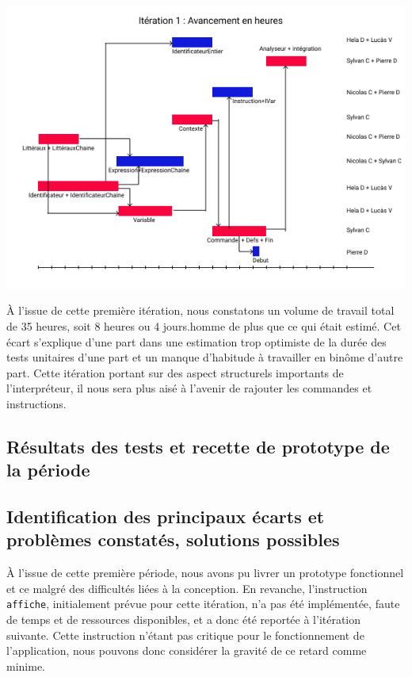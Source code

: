 \documentclass[12pt,a4paper,titlepage,openany, oneside]{report}
\begin{document}
        \includegraphics[scale=0.75]{fichiers/planification/iteration1/iteration1Avancement.png}

        \`{A} l'issue de cette première itération, nous constatons un volume de travail
        total de 35 heures, soit 8 heures ou 4 jours.homme de plus que ce qui était
        estimé. Cet écart s'explique d'une part dans une estimation trop optimiste de la
        durée des tests unitaires d'une part et un manque d'habitude à travailler en
        binôme d'autre part. Cette itération portant sur des aspect structurels importants
        de l'interpréteur, il nous sera plus aisé à l'avenir de rajouter les commandes
        et instructions.


    \subsection{Résultats des tests et recette de prototype de la période}


    \subsection{Identification des principaux écarts et problèmes constatés, solutions possibles}
        \`{A} l'issue de cette première période, nous avons pu livrer un prototype
        fonctionnel et ce malgré des difficultés liées à la conception. En revanche,
        l'instruction \verb|affiche|, initialement prévue pour cette itération, n'a
        pas été implémentée, faute de temps et de ressources disponibles, et a donc été
        reportée à l'itération suivante. Cette instruction n'étant pas critique pour
        le fonctionnement de l'application, nous pouvons donc considérer la gravité
        de ce retard comme minime.
\end{document}
